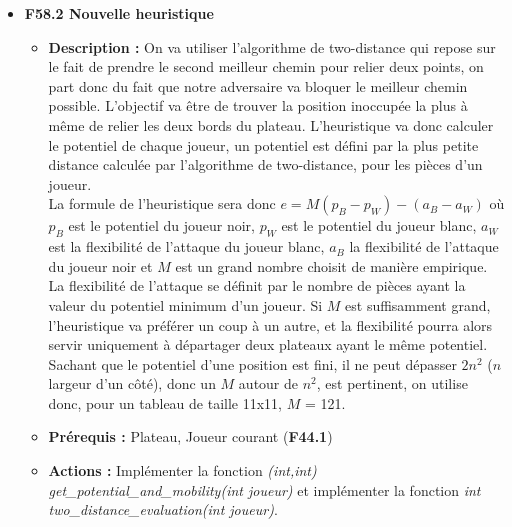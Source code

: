 \documentclass{article}
\begin{document}
\begin{itemize}
\begin{itemize}
\begin{itemize}
            \begin{itemize}
                \item \textbf{Prérequis :} Vérification des options spécifiées en ligne de commande (\textbf{F15.1})
                \item \textbf{Actions :} Récupérer l’option avec argparse. Si l’option est passée sans spécifier l’heuristique à utiliser, renvoyer une erreur et afficher la liste des heuristiques disponibles.
                \item \textbf{Tests :} Vérifier que l’heuristique spécifiée en paramètre est appelée si l’option est passée en argument du programme.
            \end{itemize}
            \smallskip
            \item \textbf{F58.2 Nouvelle heuristique}
            \begin{itemize}
                \item \textbf{Description :} On va utiliser l’algorithme de two-distance qui repose sur le fait de prendre le second meilleur chemin pour relier deux points, on part donc du fait que notre adversaire va bloquer le meilleur chemin possible. L’objectif va être de trouver la position inoccupée la plus à même de relier les deux bords du plateau. L’heuristique va donc calculer le potentiel de chaque joueur, un potentiel est défini par la plus petite distance calculée par l’algorithme de two-distance, pour les pièces d’un joueur. \\
                La formule de l’heuristique sera donc $e = M(p_B-p_W) - (a_B-a_W)$ où $p_B$ est le potentiel du joueur noir, $p_W$ est le potentiel du joueur blanc, $a_W$ est la flexibilité de l’attaque du joueur blanc, $a_B$ la flexibilité de l’attaque du joueur noir et $M$ est un grand nombre choisit de manière empirique. \\
                La flexibilité de l’attaque se définit par le nombre de pièces ayant la valeur du potentiel minimum d’un joueur.
                Si $M$ est suffisamment grand, l’heuristique va préférer un coup à un autre, et la flexibilité pourra alors servir uniquement à départager deux plateaux ayant le même potentiel. Sachant que le potentiel d’une position est fini, il ne peut dépasser $2n^2$ ($n$ largeur d’un côté), donc un $M$ autour de $n^2$, est pertinent, on utilise donc, pour un tableau de taille 11x11, $M$ = 121.
                \item \textbf{Prérequis :} Plateau, Joueur courant (\textbf{F44.1})
                \item \textbf{Actions :} Implémenter la fonction \textit{(int,int) get\_potential\_and\_mobility(int joueur)} et implémenter la fonction \textit{int two\_distance\_evaluation(int joueur)}.

\end{itemize}
\end{itemize}
\end{itemize}
\end{itemize}
\end{document}
